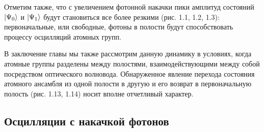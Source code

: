 Отметим также, что с увеличением фотонной накачки пики амплитуд состояний $|\Psi_{0}\rangle$ и $|\Psi_{1}\rangle$ будут становиться все более резкими ({\color{red}рис. 1.1, 1.2, 1.3}): первоначальные, или свободные, фотоны в полости будут способствовать процессу осцилляций атомных групп.

В заключение главы мы также рассмотрим данную динамику в условиях, когда атомные группы разделены между полостями, взаимодействующими между собой посредством оптического волновода. Обнаруженное явление перехода состояния атомного ансамбля из одной полости в другую и его возврат в первоначальную полость ({\color{red}рис. 1.13, 1.14}) носит вполне отчетливый характер.

\clearpage
\subsection{Осцилляции с накачкой фотонов}
\vspace{-1em}
\begin{figure}[h!]
	\noindent{}
\end{figure}

